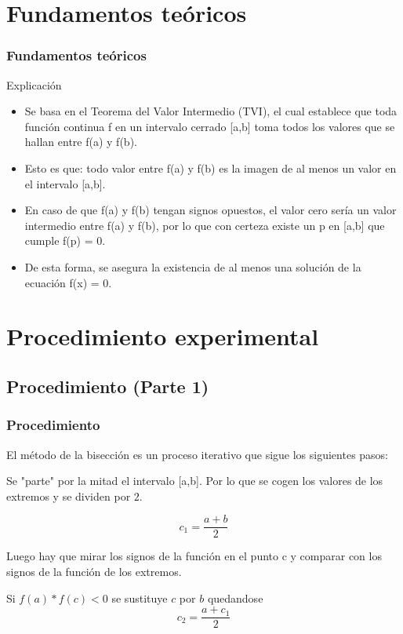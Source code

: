 \documentclass{beamer}
\begin{document}
\section{Fundamentos teóricos}
\begin{frame}

\frametitle{Fundamentos teóricos}

\begin{block}{Explicación}
  \begin{itemize}
  \item
    Se basa en el Teorema del Valor Intermedio (TVI), el cual establece que toda función continua f en un intervalo cerrado [a,b] toma todos los valores que se hallan entre f(a) y f(b). 
  \pause

  \item
    Esto es que: todo valor entre f(a) y f(b) es la imagen de al menos un valor en el intervalo [a,b]. 
  \pause

  \item
    En caso de que f(a) y f(b) tengan signos opuestos, el valor cero sería un valor intermedio entre f(a) y f(b), por lo que con certeza existe un p en [a,b] que cumple f(p) = 0. 
  \pause

  \item
    De esta forma, se asegura la existencia de al menos una solución de la ecuación f(x) = 0.
  \end{itemize}
\end{block}

\end{frame}


\section{Procedimiento experimental}

\subsection{Procedimiento (Parte 1)}
\begin{frame}
\frametitle{Procedimiento}
El método de la bisección es un proceso iterativo que sigue los siguientes pasos:
\begin{block}
 \item
  Se "parte" por la mitad el intervalo [a,b]. Por lo que se cogen los valores de los extremos y se dividen por $2$.
  \begin{center}
   $$ c_1=\frac{a+b}{2} $$
  \end{center}
 \pause
 \item
  Luego hay que mirar los signos de la función en el punto c y comparar con los signos de la función de los extremos.
 \item
  Si $f(a)*f(c)<0$ se sustituye $c$ por $b$ quedandose $$c_2=\frac{a+c_1}{2}$$ \end{block}
\end{frame}
\end{document}
